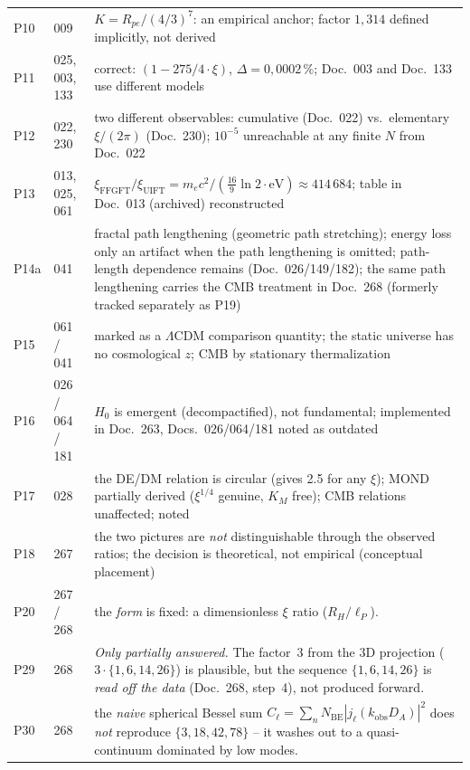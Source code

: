 \begin{longtable}{@{}p{0.9cm}p{3.1cm}p{10.2cm}@{}}
P10 & 009 & $K = R_{pe}/(4/3)^7$: an empirical anchor; \newline factor $1{,}314$ defined implicitly, not derived \\
P11 & 025, 003, 133 & correct: $(1-275/4\cdot\xi)$, $\Delta=0{,}0002\,\%$; \newline Doc.~003 and Doc.~133 use different models \\
P12 & 022, 230 & two different observables: cumulative (Doc.~022) vs.\ elementary $\xi/(2\pi)$ (Doc.~230); $10^{-5}$ unreachable at any finite $N$ from Doc.~022 \\
P13 & 013, 025, 061 & $\xi_\text{FFGFT}/\xi_\text{UIFT} = m_ec^2/(\frac{16}{9}\ln 2\cdot\text{eV}) \approx 414\,684$; \newline table in Doc.~013 (archived) reconstructed \\
P14a & 041 & fractal path lengthening (geometric path stretching); energy loss only an artifact when the path lengthening is omitted; path-length dependence remains (Doc.~026/149/182); the same path lengthening carries the CMB treatment in Doc.~268 (formerly tracked separately as P19) \\
P15 & 061 / 041 & marked as a $\Lambda$CDM comparison quantity; the static universe has no cosmological $z$; CMB by stationary thermalization \\
P16 & 026 / 064 / 181 & $H_0$ is emergent (decompactified), not fundamental; implemented in Doc.~263, Docs.~026/064/181 noted as outdated \\
P17 & 028 & the DE/DM relation is circular (gives 2.5 for any $\xi$); MOND partially derived ($\xi^{1/4}$ genuine, $K_M$ free); CMB relations unaffected; noted \\
P18 & 267 & the two pictures are \emph{not} distinguishable through the observed ratios; the decision is theoretical, not empirical (conceptual placement) \\
P20 & 267 / 268 & the \emph{form} is fixed: a dimensionless $\xi$ ratio ($R_H/\ell_P$). \\
P29 & 268 & \emph{Only partially answered.} The factor~3 from the 3D projection ($3\cdot\{1,6,14,26\}$) is plausible, but the sequence $\{1,6,14,26\}$ is \emph{read off the data} (Doc.~268, step~4), not produced forward. \\
P30 & 268 & the \emph{naive} spherical Bessel sum $C_\ell=\sum_n N_\mathrm{BE}|j_\ell(k_\mathrm{obs}D_A)|^2$ does \emph{not} reproduce $\{3,18,42,78\}$ -- it washes out to a quasi-continuum dominated by low modes. \\

\end{longtable}
